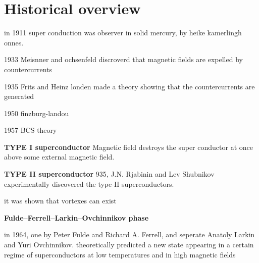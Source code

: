 \section{Historical overview}

in 1911 super conduction was observer in solid mercury, by heike kamerlingh onnes.

1933 Meisnner and ochsenfeld discroverd that magnetic fields are expelled by countercurrents

1935 Frits and Heinz londen made a theory showing that the countercurrents are generated

1950 finzburg-landou 

1957 BCS theory

\textbf{TYPE I superconductor}
Magnetic field destroys the super conductor at once above some external magnetic field.



\textbf{TYPE II superconductor}
935, J.N. Rjabinin and Lev Shubnikov experimentally discovered the type-II superconductors.

it was shown that vortexes can exist

\textbf{Fulde–Ferrell–Larkin–Ovchinnikov phase}

in 1964, one by Peter Fulde and Richard A. Ferrell, and seperate  Anatoly Larkin and Yuri Ovchinnikov. theoretically predicted a new state appearing in a certain regime of superconductors at low temperatures and in high magnetic fields